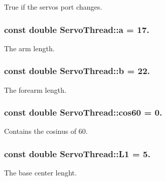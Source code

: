 True if the servos port changes. 

\hypertarget{a00007_a7dc3998d380d61406fe4485f9872edff}{}
\subsubsection[{a}]{\setlength{\rightskip}{0pt plus 5cm}const double Servo\+Thread\+::a = 17.\hspace{0.3cm}{\ttfamily [private]}}\label{a00007_a7dc3998d380d61406fe4485f9872edff}


The arm length. 

\hypertarget{a00007_a14f03febaa39a60b9bf7ff9b9151060c}{}
\subsubsection[{b}]{\setlength{\rightskip}{0pt plus 5cm}const double Servo\+Thread\+::b = 22.\hspace{0.3cm}{\ttfamily [private]}}\label{a00007_a14f03febaa39a60b9bf7ff9b9151060c}


The forearm length. 

\hypertarget{a00007_a86dc58ff23326f939cd6fb610ac90d53}{}
\subsubsection[{cos60}]{\setlength{\rightskip}{0pt plus 5cm}const double Servo\+Thread\+::cos60 = 0.\hspace{0.3cm}{\ttfamily [private]}}\label{a00007_a86dc58ff23326f939cd6fb610ac90d53}


Contains the cosinus of 60. 

\hypertarget{a00007_a6281142e50115dd8c914c14cfae6f90d}{}
\subsubsection[{L1}]{\setlength{\rightskip}{0pt plus 5cm}const double Servo\+Thread\+::\+L1 = 5.\hspace{0.3cm}{\ttfamily [private]}}\label{a00007_a6281142e50115dd8c914c14cfae6f90d}


The base center lenght. 


